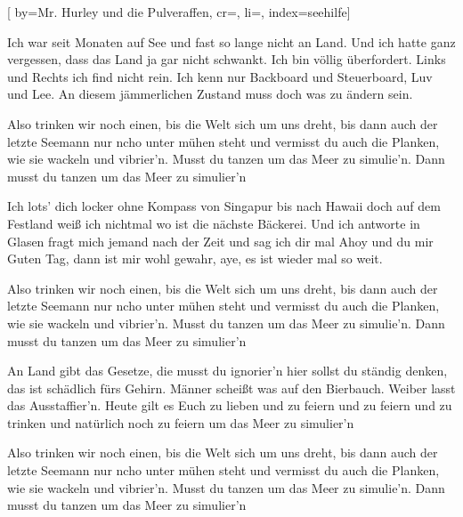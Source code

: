 

[%
    by={Mr. Hurley und die Pulveraffen},
    cr={},
    li={},
    index={seehilfe}]


    \label{seehilfe}

    \beginverse\memorize[verse]
        Ich war seit Monaten auf See
        und fast so lange nicht an Land.
        Und ich hatte ganz vergessen,
        dass das Land ja gar nicht schwankt.
        Ich bin völlig überfordert.
        Links und Rechts ich find nicht rein.
        Ich kenn nur Backboard und Steuerboard,
        Luv und Lee.
        An diesem jämmerlichen Zustand muss doch was zu ändern sein.
    \endverse

    \beginchorus\memorize[chorus]
        Also trinken wir noch einen, bis die Welt sich um uns dreht,
        bis dann auch der letzte Seemann nur ncho unter mühen steht
        und vermisst du auch die Planken, wie sie wackeln und vibrier'n.
        Musst du tanzen um das Meer zu simulie'n.
        Dann musst du tanzen um das Meer zu simulier'n
    \endchorus

    \beginverse\replay[verse]
        Ich lots' dich locker ohne Kompass
        von Singapur bis nach Hawaii
        doch auf dem Festland weiß ich nichtmal
        wo ist die nächste Bäckerei.
        Und ich antworte in Glasen
        fragt mich jemand nach der Zeit
        und sag ich dir mal Ahoy und du mir Guten Tag,
        dann ist mir wohl gewahr,
        aye, es ist wieder mal so weit.
    \endverse

    \beginchorus\replay[chorus]
        Also trinken wir noch einen, bis die Welt sich um uns dreht,
        bis dann auch der letzte Seemann nur ncho unter mühen steht
        und vermisst du auch die Planken, wie sie wackeln und vibrier'n.
        Musst du tanzen um das Meer zu simulie'n.
        Dann musst du tanzen um das Meer zu simulier'n
    \endchorus

    \beginverse\replay[verse]
        An Land gibt das Gesetze,
        die musst du ignorier'n
        hier sollst du ständig denken,
        das ist schädlich fürs Gehirn.
        Männer scheißt was auf den Bierbauch.
        Weiber lasst das Ausstaffier'n.
        Heute gilt es Euch zu lieben und zu feiern und zu feiern und zu trinken und natürlich noch zu feiern um das Meer zu simulier'n
    \endverse

    \beginchorus\replay[chorus]
        Also trinken wir noch einen, bis die Welt sich um uns dreht,
        bis dann auch der letzte Seemann nur ncho unter mühen steht
        und vermisst du auch die Planken, wie sie wackeln und vibrier'n.
        Musst du tanzen um das Meer zu simulie'n.
        Dann musst du tanzen um das Meer zu simulier'n
    \endchorus
\endsong

